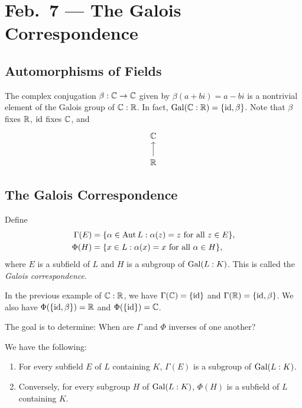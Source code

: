 \chapter{Feb.~7 --- The Galois Correspondence}

\section{Automorphisms of Fields}

\begin{example}
  The complex conjugation $\beta : \mathbb{C} \to \mathbb{C}$ given
  by $\beta(a + bi) = a - bi$ is a nontrivial element
  of the Galois group of $\mathbb{C} : \mathbb{R}$. In fact,
  $\operatorname{Gal}(\mathbb{C} : \mathbb{R}) = \{\mathrm{id}, \beta\}$. Note that
  $\beta$ fixes $\mathbb{R}$, $\mathrm{id}$ fixes $\mathbb{C}$, and
  \[
  \begin{tikzcd}
    \C \\
    \R \uar
  \end{tikzcd}
  \]
\end{example}

\section{The Galois Correspondence}

\begin{definition}
  Define
  \begin{align*}
    \Gamma(E) &= \{
      \alpha \in \operatorname{Aut} L : \alpha(z) = z \text{ for all } z \in E
    \}, \\
    \Phi(H) &= \{
    x \in L : \alpha(x) = x \text{ for all } \alpha \in H
    \},
  \end{align*}
  where $E$ is a subfield of $L$ and $H$ is a subgroup
  of $\operatorname{Gal}(L : K)$. This is called the
  \emph{Galois correspondence}.
\end{definition}

\begin{example}
  In the previous example of $\mathbb{C} : \mathbb{R}$, we have
  $\Gamma(\mathbb{C}) = \{\mathrm{id}\}$ and $\Gamma(\mathbb{R}) = \{\mathrm{id}, \beta\}$.
  We also have $\Phi(\{\mathrm{id}, \beta\}) = \mathbb{R}$ and
  $\Phi(\{\mathrm{id}\}) = \mathbb{C}$.
\end{example}

\begin{remark}
  The goal is to determine: When are $\Gamma$ and
  $\Phi$ inverses of one another?
\end{remark}

\begin{theorem}
  We have the following:
  \begin{enumerate}
    \item For every subfield $E$ of $L$ containing $K$,
      $\Gamma(E)$ is a subgroup of $\operatorname{Gal}(L : K)$.
    \item Conversely, for every subgroup $H$
      of $\operatorname{Gal}(L : K)$, $\Phi(H)$ is a subfield of $L$
      containing $K$.
  \end{enumerate}
\end{theorem}

